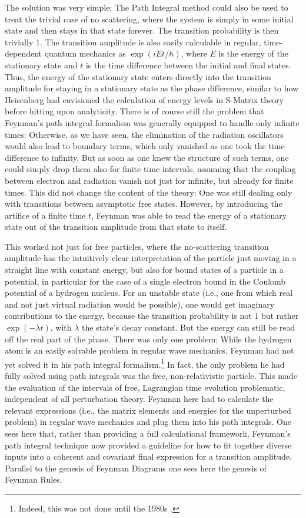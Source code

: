\documentclass[12pt,a4paper]{article}
\begin{document}
The solution was very simple: The Path Integral method could also be used to treat the trivial case of no scattering, where the system is simply in some initial state and then stays in that state forever. The transition probability is then trivially 1. The transition amplitude is also easily calculable in regular, time-dependent quantum mechanics as $\exp{(i E t/\hbar)}$, where $E$ is the energy of the stationary state and $t$ is the time difference between the initial and final states. Thus, the energy of the stationary state enters directly into the transition amplitude for staying in a stationary state as the phase difference, similar to how Heisenberg had envisioned the calculation of energy levels in S-Matrix theory before hitting upon analyticity. There is of course still the problem that Feynman's path integral formalism was generally equipped to handle only infinite times: Otherwise, as we have seen, the elimination of the radiation oscillators would also lead to boundary terms, which only vanished as one took the time difference to infinity. But as soon as one knew the structure of such terms, one could simply drop them also for finite time intervals, assuming that the coupling between electron and radiation vanish not just for infinite, but already for finite times. This did not change the content of the theory: One was still dealing only with transitions between asymptotic free states. However, by introducing the artifice of a finite time $t$, Feynman was able to read the energy of a stationary state out of the transition amplitude from that state to itself.

This worked not just for free particles, where the no-scattering transition amplitude has the intuitively clear interpretation of the particle just moving in a straight line with constant energy, but also for bound states of a particle in a potential, in particular for the case of a single electron bound in the Coulomb potential of a hydrogen nucleus. For an unstable state (i.e., one from which real and not just virtual radiation would be possible), one would get imaginary contributions to the energy, because the transition probability is not 1 but rather $\exp{(- \lambda t)}$, with $\lambda$ the state's decay constant. But the energy can still be read off the real part of the phase. There was only one problem: While the hydrogen atom is an easily solvable problem in regular wave mechanics, Feynman had not yet solved it in his path integral formalism.\footnote{Indeed, this was not done until the 1980s \citep{duru_1982_quantum}.} In fact, the only problem he had fully solved using path integrals was the free, non-relativistic particle. This made the evaluation of the intervals of free, Lagrangian time evolution problematic, independent of all perturbation theory. Feynman here had to calculate the relevant expressions (i.e., the matrix elements and energies for the unperturbed problem) in regular wave mechanics and plug them into his path integrals. One sees here that, rather than providing a full calculational framework, Feynman's path integral technique now provided a guideline for how to fit together diverse inputs into a coherent and covariant final expression for a transition amplitude. Parallel to the genesis of Feynman Diagrams one sees here the genesis of Feynman Rules.
\end{document}
